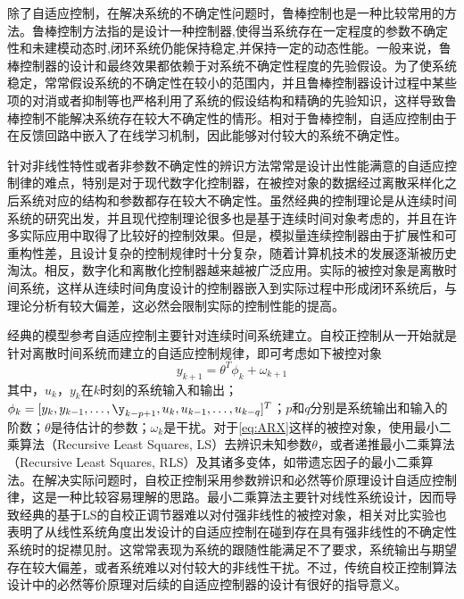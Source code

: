 除了自适应控制，在解决系统的不确定性问题时，鲁棒控制也是一种比较常用的方法。鲁棒控制方法指的是设计一种控制器,使得当系统存在一定程度的参数不确定性和未建模动态时,闭环系统仍能保持稳定,并保持一定的动态性能。一般来说，鲁棒控制器的设计和最终效果都依赖于对系统不确定性程度的先验假设。为了使系统稳定，常常假设系统的不确定性在较小的范围内，并且鲁棒控制器设计过程中某些项的对消或者抑制等也严格利用了系统的假设结构和精确的先验知识，这样导致鲁棒控制不能解决系统存在较大不确定性的情形。相对于鲁棒控制，自适应控制由于在反馈回路中嵌入了在线学习机制，因此能够对付较大的系统不确定性。

针对非线性特性或者非参数不确定性的辨识方法常常是设计出性能满意的自适应控制律的难点，特别是对于现代数字化控制器，在被控对象的数据经过离散采样化之后系统对应的结构和参数都存在较大不确定性。虽然经典的控制理论是从连续时间系统的研究出发，并且现代控制理论很多也是基于连续时间对象考虑的，并且在许多实际应用中取得了比较好的控制效果。但是，模拟量连续控制器由于扩展性和可重构性差，且设计复杂的控制规律时十分复杂，随着计算机技术的发展逐渐被历史淘汰。相反，数字化和离散化控制器越来越被广泛应用。实际的被控对象是离散时间系统，这样从连续时间角度设计的控制器嵌入到实际过程中形成闭环系统后，与理论分析有较大偏差，这必然会限制实际的控制性能的提高。

经典的模型参考自适应控制主要针对连续时间系统建立。自校正控制从一开始就是针对离散时间系统而建立的自适应控制规律，即可考虑如下被控对象
\begin{equation}%
\label{eq:ARX}
y_{k+1} = \theta^{T} \phi_{k} + \omega_{k+1}
\end{equation}
其中，$u_{k}$，$y_{k}$在$k$时刻的系统输入和输出；$\phi_{k} = [y_{k},y_{k-1},\ldots,\y_{k-p+1},u_{k},u_{k-1},\ldots,u_{k-q}]^{T}$；$p$和$q$分别是系统输出和输入的阶数；$\theta$是待估计的参数；$\omega_{k}$是干扰。对于\eqref{eq:ARX}这样的被控对象，使用最小二乘算法（Recursive Least Squares, LS）去辨识未知参数$\theta$，或者递推最小二乘算法（Recursive Least Squares, RLS）及其诸多变体，如带遗忘因子的最小二乘算法。在解决实际问题时，自校正控制采用参数辨识和必然等价原理设计自适应控制律，这是一种比较容易理解的思路。最小二乘算法主要针对线性系统设计，因而导致经典的基于LS的自校正调节器难以对付强非线性的被控对象，相关对比实验也表明了从线性系统角度出发设计的自适应控制在碰到存在具有强非线性的不确定性系统时的捉襟见肘。这常常表现为系统的跟随性能满足不了要求，系统输出与期望存在较大偏差，或者系统难以对付较大的非线性干扰。不过，传统自校正控制算法设计中的必然等价原理对后续的自适应控制器的设计有很好的指导意义。

